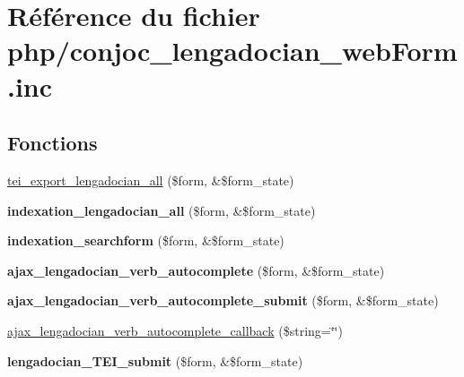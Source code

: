 \hypertarget{php_2conjoc__lengadocian__webForm_8inc}{}\section{Référence du fichier php/conjoc\+\_\+lengadocian\+\_\+web\+Form.inc}
\label{php_2conjoc__lengadocian__webForm_8inc}
\subsection*{Fonctions}
\begin{DoxyCompactItemize}
\item 
\hyperlink{php_2conjoc__lengadocian__webForm_8inc_a9c7725a828c1a44761bc51fe7a346215}{tei\+\_\+export\+\_\+lengadocian\+\_\+all} (\$form, \&\$form\+\_\+state)
\item 
\hypertarget{php_2conjoc__lengadocian__webForm_8inc_a465cce16b0d09f364ccb546c46c82306}{}\label{php_2conjoc__lengadocian__webForm_8inc_a465cce16b0d09f364ccb546c46c82306} 
{\bfseries indexation\+\_\+lengadocian\+\_\+all} (\$form, \&\$form\+\_\+state)
\item 
\hypertarget{php_2conjoc__lengadocian__webForm_8inc_a3f7b0b4a8f4301190850532d5488c54a}{}\label{php_2conjoc__lengadocian__webForm_8inc_a3f7b0b4a8f4301190850532d5488c54a} 
{\bfseries indexation\+\_\+searchform} (\$form, \&\$form\+\_\+state)
\item 
\hypertarget{php_2conjoc__lengadocian__webForm_8inc_a95265729a90a0b79d7d98483fce78880}{}\label{php_2conjoc__lengadocian__webForm_8inc_a95265729a90a0b79d7d98483fce78880} 
{\bfseries ajax\+\_\+lengadocian\+\_\+verb\+\_\+autocomplete} (\$form, \&\$form\+\_\+state)
\item 
\hypertarget{php_2conjoc__lengadocian__webForm_8inc_a2206d720f533b7b1afa6ac0568e740ef}{}\label{php_2conjoc__lengadocian__webForm_8inc_a2206d720f533b7b1afa6ac0568e740ef} 
{\bfseries ajax\+\_\+lengadocian\+\_\+verb\+\_\+autocomplete\+\_\+submit} (\$form, \&\$form\+\_\+state)
\item 
\hyperlink{php_2conjoc__lengadocian__webForm_8inc_a26cea88ddc504d14492fa9fd58a060b4}{ajax\+\_\+lengadocian\+\_\+verb\+\_\+autocomplete\+\_\+callback} (\$string=\char`\"{}\char`\"{})
\item 
\hypertarget{php_2conjoc__lengadocian__webForm_8inc_a704a4de756f6a38064970e97d4a2bc6c}{}\label{php_2conjoc__lengadocian__webForm_8inc_a704a4de756f6a38064970e97d4a2bc6c} 
{\bfseries lengadocian\+\_\+\+T\+E\+I\+\_\+submit} (\$form, \&\$form\+\_\+state)

\end{DoxyCompactItemize}
